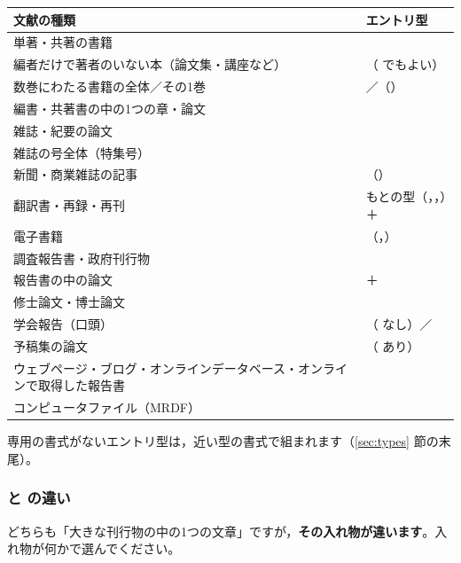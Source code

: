 \begin{center}\small
\begin{tabular}{@{}L{0.44\textwidth}L{0.44\textwidth}@{}}
\toprule
\textbf{文献の種類} & \textbf{エントリ型} \\
\midrule
単著・共著の書籍 &  \\
編者だけで著者のいない本（論文集・講座など） & （ でもよい） \\
数巻にわたる書籍の全体／その1巻 & ／（） \\
編書・共著書の中の1つの章・論文 &  \\
雑誌・紀要の論文 &  \\
雑誌の号全体（特集号） &  \\
新聞・商業雑誌の記事 & （） \\
翻訳書・再録・再刊 & もとの型（，，）＋ \\
電子書籍 & （，） \\
調査報告書・政府刊行物 &  \\
報告書の中の論文 & ＋ \\
修士論文・博士論文 &  \\
学会報告（口頭） & （ なし）／ \\
予稿集の論文 & （ あり） \\
ウェブページ・ブログ・オンラインデータベース・オンラインで取得した報告書 &  \\
コンピュータファイル（MRDF） &  \\
\bottomrule
\end{tabular}
\end{center}

専用の書式がないエントリ型は，近い型の書式で組まれます（\ref{sec:types} 節の末尾）。

\subsubsection{ と  の違い}\label{sec:artcoll}
どちらも「大きな刊行物の中の1つの文章」ですが，\textbf{その入れ物が違います}。入れ物が何かで選んでください。


